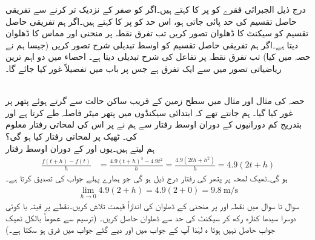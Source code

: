 درج ذیل الجبرائی فقرے کو  پر  کا   کہتے ہیں۔اگر  کو صفر کے نزدیک تر کرنے سے تفریقی حاصل تقسیم کی حد پائی جاتی ہو، اس حد کو  پر  کا  کہتے ہیں۔اگر ہم تفریقی حاصل تقسیم کو سیکنٹ کا  ڈھلوان تصور کریں تب تفرق نقطہ  پر منحنی اور مماس کا ڈھلوان دیتا ہے۔اگر ہم تفریقی حاصل تقسیم کو اوسط تبدیلی شرح تصور کریں (جیسا ہم نے حصہ  میں کیا) تب تفرق نقطہ  پر تفاعل کی شرح تبدیلی دیتا ہے۔  احصاء میں دو اہم ترین ریاضیاتی تصور میں سے ایک تفرق ہے جس پر باب  میں تفصیلاً غور کیا جائے گا۔

\\
حصہ  کی مثال  اور مثال  میں سطح زمین کے قریب  ساکن حالت  سے  گرتے ہوئے پتھر پر غور کیا گیا۔ ہم جانتے تھے کہ ابتدائی   سیکنڈوں میں  پتھر   میٹر فاصلہ طے کرتا ہے اور بتدریج کم دورانیوں  کے دوران اوسط رفتار سے  ہم نے  پر اس کی لمحاتی رفتار معلوم کی۔ ٹھیک  پر لمحاتی رفتار کیا ہو گی؟\\
ہم  لیتے ہیں۔یوں  اور  کے دوران اوسط رفتار
\begin{align*}
\frac{f(t+h)-f(t)}{h}&=\frac{4.9(t+h)^2-4.9t^2}{h}=\frac{4.9(2th+h^2)}{h}=4.9(2t+h)
\end{align*}
ہو گی۔ٹھیک لمحہ  پر پتھر کی رفتار درج ذیل ہو گی جو ہمارے  پہلے جواب کی تصدیق کرتا ہے۔
\begin{align*}
\lim_{h\to 0} 4.9(2+h)=4.9(2+0)=\SI{9.8}{\meter\per\second}
\end{align*}
سوال  تا سوال  میں نقطہ  اور  پر منحنی کے ڈھلوان کی اندازاً قیمت تلاش کریں۔نقطے پر فیتہ یا کوئی دوسرا سیدھا کنارہ رکھ کر سیکنٹ کی حد سے ڈھلوان حاصل کریں۔ (ترسیم سے عموماً بالکل ٹھیک جواب حاصل نہیں ہوتا ہ لہٰذا آپ کے جواب میں اور دیے گئے جواب میں فرق ہو سکتا ہے۔)  

